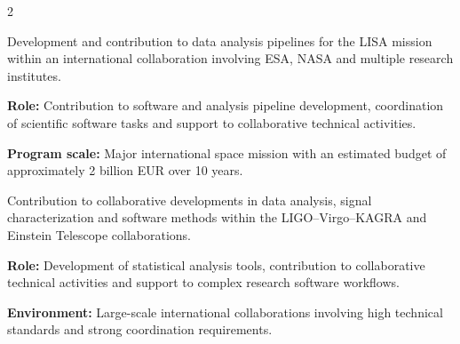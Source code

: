 \documentclass[8pt,a4paper,ragged2e,withhyper]{altacv}
\begin{document}
\begin{paracol}{2}






\end{paracol}

\newpage
{}


Development and contribution to data analysis pipelines for the LISA mission within an international collaboration involving ESA, NASA and multiple research institutes.

\textbf{Role:} Contribution to software and analysis pipeline development, coordination of scientific software tasks and support to collaborative technical activities.

\textbf{Program scale:} Major international space mission with an estimated budget of approximately 2 billion EUR over 10 years.

\divider


Contribution to collaborative developments in data analysis, signal characterization and software methods within the LIGO--Virgo--KAGRA and Einstein Telescope collaborations.

\textbf{Role:} Development of statistical analysis tools, contribution to collaborative technical activities and support to complex research software workflows.

\textbf{Environment:} Large-scale international collaborations involving high technical standards and strong coordination requirements.
\divider
\end{document}
